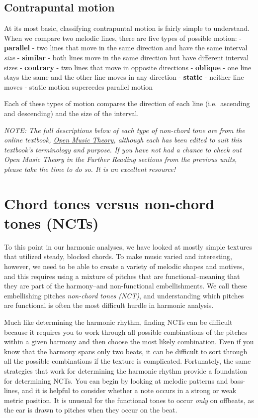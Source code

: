 \documentclass{book}
\begin{document}
\hypertarget{contrapuntal-motion}{%
\subsection{Contrapuntal motion}\label{contrapuntal-motion}}

At its most basic, classifying contrapuntal motion is fairly simple to
understand. When we compare two melodic lines, there are five types of
possible motion: - \textbf{parallel} - two lines that move in the same
direction and have the same interval \emph{size} - \textbf{similar} - both
lines move in the same direction but have different interval sizes -
\textbf{contrary} - two lines that move in opposite directions -
\textbf{oblique} - one line stays the same and the other line moves in any
direction - \textbf{static} - neither line moves - static motion supercedes
parallel motion

Each of these types of motion compares the direction of each line
(i.e.~ascending and descending) and the size of the interval.

\emph{NOTE: The full descriptions below of each type of non-chord tone are
from the online textbook, \href{http://www.openmusictheory.com}{Open Music
Theory}, although each has been edited to suit this textbook's terminology and
purpose. If you have not had a chance to check out Open Music Theory in the
Further Reading sections from the previous units, please take the time to do
so. It is an excellent resource!}

\hypertarget{chord-tones-versus-non-chord-tones-ncts}{%
\section{Chord tones versus non-chord tones
(NCTs)}\label{chord-tones-versus-non-chord-tones-ncts}}

To this point in our harmonic analyses, we have looked at mostly simple
textures that utilized steady, blocked chords. To make music varied and
interesting, however, we need to be able to create a variety of melodic shapes
and motives, and this requires using a mixture of pitches that are
functional--meaning that they are part of the harmony--and non-functional
embellishments. We call these embellishing pitches \emph{non-chord tones
(NCT)}, and understanding which pitches are functional is often the most
difficult hurdle in harmonic analysis.

Much like determining the harmonic rhythm, finding NCTs can be difficult
because it requires you to work through all possible combinations of the
pitches within a given harmony and then choose the most likely combination.
Even if you know that the harmony spans only two beats, it can be difficult to
sort through all the possible combinations if the texture is complicated.
Fortunately, the same strategies that work for determining the harmonic rhythm
provide a foundation for determining NCTs. You can begin by looking at melodic
patterns and bass-lines, and it is helpful to consider whether a note occurs
in a strong or weak metric position. It is unusual for the functional tones to
occur \emph{only} on offbeats, as the ear is drawn to pitches when they occur
on the beat.
\end{document}
